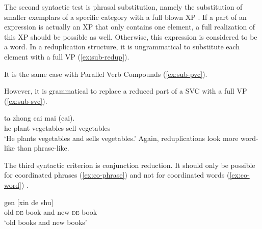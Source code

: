 The second syntactic test is phrasal substitution, namely the substitution of smaller exemplars of a specific category with a full blown XP \citetext{\citealp[152]{Duanmu1998}; \citealp[280]{Schaefer2009}}. 
If a part of an expression is actually an XP that only contains one element, a full realization of this XP should be possible as well.
Otherwise, this expression is considered to be a word.
In a reduplication structure, it is ungrammatical to substitute each element with a full {VP} (\ref{ex:sub-redup}).

\ea\label{ex:sub-redup}
    
  \z
\z

It is the same case with Parallel Verb Compounds (\ref{ex:sub-pvc}).

\label{ex:sub-pvc}
\z

However, it is grammatical to replace a reduced part of a {SVC} with a full VP (\ref{ex:sub-svc}).

\ea\label{ex:sub-svc}
\gll ta zhong cai mai (cai).\\
 he plant vegetables sell vegetables\\
\glt `He plants vegetables and sells vegetables.'
 \z
Again, reduplications look more word-like than phrase-like.


The third syntactic criterion is conjunction reduction. It should only be possible for coordinated phrases (\ref{ex:co-phrase}) and not for coordinated words (\ref{ex:co-word}) \citetext{\citealp[137]{Duanmu1998}; \citealp[283]{Schaefer2009}}.

\settowidth{}

\ea\label{ex:co-phrase}
  \ea {} gen [xin de shu]\\
  old \textsc{de} book and new \textsc{de} book\\ 
  \glt `old books and new books'
  
